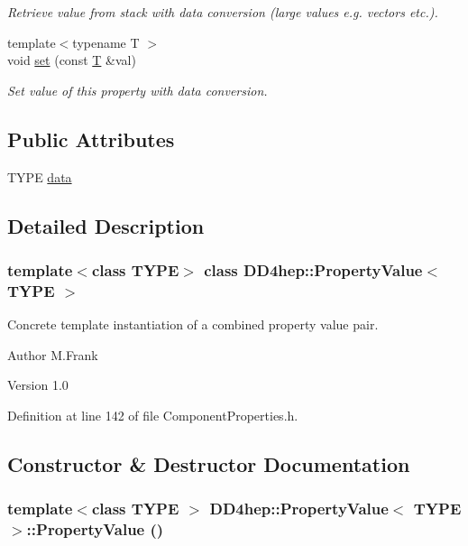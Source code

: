 \begin{DoxyCompactItemize}
\begin{DoxyCompactList}\small\item\em Retrieve value from stack with data conversion (large values e.g. vectors etc.). \item\end{DoxyCompactList}\item 
{\footnotesize template$<$typename T $>$ }\\void \hyperlink{class_d_d4hep_1_1_property_value_aff3084db0cda114788abc5788bb0d4c3}{set} (const \hyperlink{class_t}{T} \&val)
\begin{DoxyCompactList}\small\item\em Set value of this property with data conversion. \item\end{DoxyCompactList}\end{DoxyCompactItemize}
\subsection*{Public Attributes}
\begin{DoxyCompactItemize}
\item 
TYPE \hyperlink{class_d_d4hep_1_1_property_value_ad38a9abb3265886b815fa435ca481e24}{data}
\end{DoxyCompactItemize}


\subsection{Detailed Description}
\subsubsection*{template$<$class TYPE$>$ class DD4hep::PropertyValue$<$ TYPE $>$}

Concrete template instantiation of a combined property value pair. \begin{DoxyAuthor}{Author}
M.Frank 
\end{DoxyAuthor}
\begin{DoxyVersion}{Version}
1.0 
\end{DoxyVersion}


Definition at line 142 of file ComponentProperties.h.

\subsection{Constructor \& Destructor Documentation}
\hypertarget{class_d_d4hep_1_1_property_value_a6dcb85ebdb83313c9593c86431b3316e}{
\subsubsection[{PropertyValue}]{\setlength{\rightskip}{0pt plus 5cm}template$<$class TYPE $>$ {\bf DD4hep::PropertyValue}$<$ TYPE $>$::{\bf PropertyValue} ()}}
\label{class_d_d4hep_1_1_property_value_a6dcb85ebdb83313c9593c86431b3316e}


